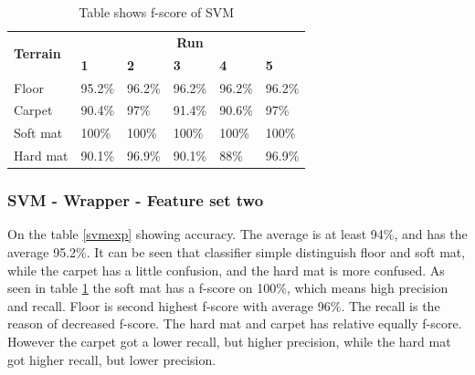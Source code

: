 \documentclass[USenglish]{ifimaster}  %
\begin{document}
	\begin{table}[h]
		\centering
		\begin{tabular}{@{}llllll@{}}
			\toprule
			\multirow{2}{*}{\textbf{Terrain}} & \multicolumn{5}{c}{\textbf{Run}} \\ \cmidrule(l){2-6} 
			& \multicolumn{1}{l|}{\textbf{1}} & \multicolumn{1}{l|}{\textbf{2}} & \multicolumn{1}{l|}{\textbf{3}} & \multicolumn{1}{l|}{\textbf{4}} & \textbf{5} \\ \midrule
			\multicolumn{1}{l|}{Floor} & \multicolumn{1}{l|}{95.2\%} & \multicolumn{1}{l|}{96.2\%} & \multicolumn{1}{l|}{96.2\%} & \multicolumn{1}{l|}{96.2\%} & 96.2\% \\ \midrule
			\multicolumn{1}{l|}{Carpet} & \multicolumn{1}{l|}{90.4\%} & \multicolumn{1}{l|}{97\%} & \multicolumn{1}{l|}{91.4\%} & \multicolumn{1}{l|}{90.6\%} & 97\% \\ \midrule
			\multicolumn{1}{l|}{Soft mat} & \multicolumn{1}{l|}{100\%} & \multicolumn{1}{l|}{100\%} & \multicolumn{1}{l|}{100\%} & \multicolumn{1}{l|}{100\%} & 100\% \\ \midrule
			\multicolumn{1}{l|}{Hard mat} & \multicolumn{1}{l|}{90.1\%} & \multicolumn{1}{l|}{96.9\%} & \multicolumn{1}{l|}{90.1\%} & \multicolumn{1}{l|}{88\%} & 96.9\% \\ \bottomrule
		\end{tabular}
		\caption{Table shows f-score of SVM}
		\label{fscoresvm}
	\end{table}
	\FloatBarrier
	\subsubsection{SVM - Wrapper - Feature set two}
	On the table \ref{svmexp} showing accuracy. The average is at least 94\%, and has the average 95.2\%. It can be seen that classifier simple distinguish floor and soft mat, while the carpet has a little confusion, and the hard mat is more confused. As seen in table \ref{fscoresvm} the soft mat has a f-score on 100\%, which means high precision and recall. Floor is second highest f-score with average 96\%. The recall is the reason of decreased f-score. The hard mat and carpet has relative equally f-score. However the carpet got a lower recall, but higher precision, while the hard mat got higher recall, but lower precision. 
	
\end{document}
